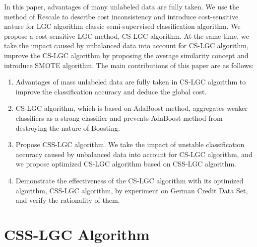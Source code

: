 \documentclass{svjour3}                     %
\begin{document}
In this paper, advantages of many unlabeled data are fully taken. We use the method of Rescale to describe cost inconsistency and introduce cost-sensitive nature for LGC algorithm classic semi-supervised classification algorithm. We propose a cost-sensitive LGC method, CS-LGC algorithm. At the same time, we take the impact caused by unbalanced data into account for CS-LGC algorithm, improve the CS-LGC algorithm by proposing the average similarity concept and introduce SMOTE algorithm. The main contributions of this paper are as follows:
\begin{enumerate}[(1)]
  \item Advantages of mass unlabeled data are fully taken in CS-LGC algorithm to improve the classification accuracy and deduce the global cost. 
  \item CS-LGC algorithm, which is based on AdaBoost method, aggregates weaker classifiers as a strong classifier and prevents AdaBoost method from destroying the nature of Boosting.
  \item Propose CSS-LGC algorithm. We take the impact of unstable classification accuracy caused by unbalanced data into account for CS-LGC algorithm, and we propose optimized CS-LGC algorithm based on CSS-LGC algorithm.
  \item Demonstrate the effectiveness of the CS-LGC algorithm with its optimized algorithm, CSS-LGC algorithm, by experiment on German Credit Data Set, and verify the rationality of them.
\end{enumerate}

\section{CSS-LGC Algorithm}
\end{document}
